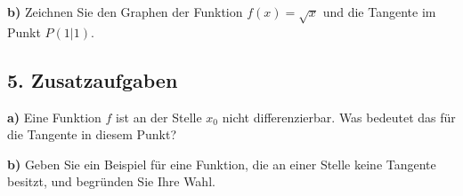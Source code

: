 \textbf{b)} Zeichnen Sie den Graphen der Funktion $f(x) = \sqrt{x}$ und die Tangente im Punkt $P(1|1)$.

\subsection*{5. Zusatzaufgaben}
\textbf{a)} Eine Funktion $f$ ist an der Stelle $x_0$ nicht differenzierbar. Was bedeutet das für die Tangente in diesem Punkt?

\textbf{b)} Geben Sie ein Beispiel für eine Funktion, die an einer Stelle keine Tangente besitzt, und begründen Sie Ihre Wahl.